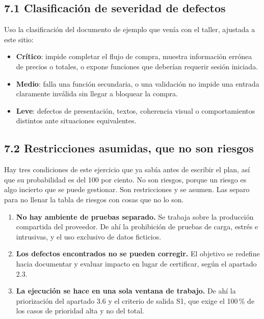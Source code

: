 \documentclass[11pt,a4paper]{article}
\begin{document}
\subsection*{7.1 Clasificación de severidad de defectos}

Uso la clasificación del documento de ejemplo que venía con el taller, ajustada a
este sitio:

\begin{itemize}
  \item \textbf{Crítico}: impide completar el flujo de compra, muestra información
        errónea de precios o totales, o expone funciones que deberían requerir
        sesión iniciada.
  \item \textbf{Medio}: falla una función secundaria, o una validación no impide
        una entrada claramente inválida sin llegar a bloquear la compra.
  \item \textbf{Leve}: defectos de presentación, textos, coherencia visual o
        comportamientos distintos ante situaciones equivalentes.
\end{itemize}

\subsection*{7.2 Restricciones asumidas, que no son riesgos}

Hay tres condiciones de este ejercicio que ya sabía antes de escribir el plan, así
que su probabilidad es del 100 por ciento. No son riesgos, porque un riesgo es algo
incierto que se puede gestionar. Son restricciones y se asumen. Las separo para no
llenar la tabla de riesgos con cosas que no lo son.

\begin{enumerate}[label=C\arabic*.]
  \item \textbf{No hay ambiente de pruebas separado.} Se trabaja sobre la
        producción compartida del proveedor. De ahí la prohibición de pruebas de
        carga, estrés e intrusivas, y el uso exclusivo de datos ficticios.
  \item \textbf{Los defectos encontrados no se pueden corregir.} El objetivo se
        redefine hacia documentar y evaluar impacto en lugar de certificar, según
        el apartado 2.3.
  \item \textbf{La ejecución se hace en una sola ventana de trabajo.} De ahí la
        priorización del apartado 3.6 y el criterio de salida S1, que exige el
        100\,\% de los casos de prioridad alta y no del total.
\end{enumerate}
\end{document}
